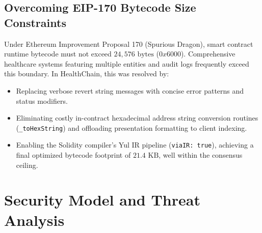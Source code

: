 \documentclass[11pt,a4paper]{article}
\begin{document}
\subsection{Overcoming EIP-170 Bytecode Size Constraints}
Under Ethereum Improvement Proposal 170 (Spurious Dragon), smart contract runtime bytecode must not exceed $24,576\text{ bytes}$ ($0x6000$). Comprehensive healthcare systems featuring multiple entities and audit logs frequently exceed this boundary. In HealthChain, this was resolved by:
\begin{itemize}
    \item Replacing verbose revert string messages with concise error patterns and status modifiers.
    \item Eliminating costly in-contract hexadecimal address string conversion routines (\texttt{\_toHexString}) and offloading presentation formatting to client indexing.
    \item Enabling the Solidity compiler's Yul IR pipeline (\texttt{viaIR: true}), achieving a final optimized bytecode footprint of $21.4\text{ KB}$, well within the consensus ceiling.
\end{itemize}

\section{Security Model and Threat Analysis}
\end{document}
